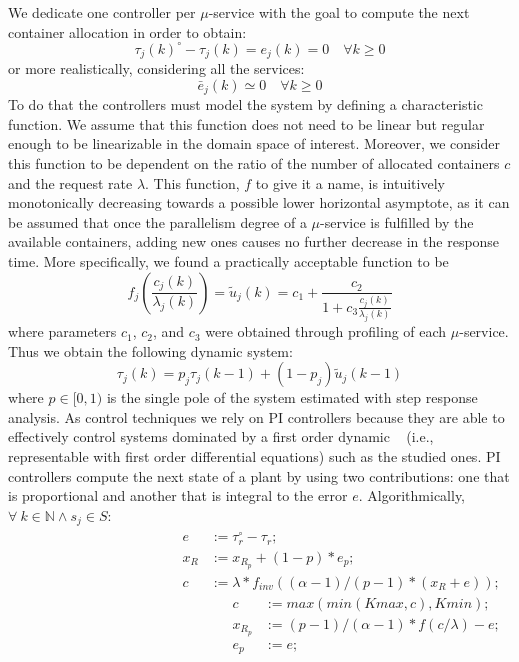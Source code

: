 We dedicate one controller per $\mu$-service with the goal to compute the next container allocation in order to obtain:
{\scriptsize
\begin{equation}
\tau_j(k)^\circ - \tau_j(k) = e_j(k) = 0\quad \forall{k} \ge 0
\end{equation}
}%
or more realistically, considering all the services:
{\scriptsize
\begin{equation}
\bar{e}_j(k) \simeq 0 \quad \forall{k} \ge 0
\end{equation}
}%
To do that the controllers must model the system 
by defining a characteristic function. We assume that this function does not need to be linear but regular enough to be linearizable in the domain space of interest. Moreover, we consider this function to be dependent on the ratio of the number of allocated containers $c$ and the request rate $\lambda$. This function, $f$ to give it a name, is intuitively monotonically decreasing towards a possible lower horizontal asymptote, as it can be assumed that once the parallelism degree of a $\mu$-service is fulfilled by the available containers, adding new ones causes no further decrease in the response time. More specifically, we found a practically acceptable function to be
{\scriptsize
\begin{equation}
f_j \left( \frac{c_j(k)}{\lambda_j(k)}\right)  = \widetilde{u}_j(k) = c_1+\frac{c_2}{1+c_3\frac{c_j(k)}{\lambda_j(k)}}
\label{eqn:CsysModel-f}
\end{equation}
}%
\noindent where parameters $c_1$, $c_2$, and $c_3$ were obtained through profiling of each $\mu$-service. Thus we obtain the following dynamic system:
{\scriptsize
\begin{equation}
\tau_j(k)  = p_j \tau_j(k-1) + (1-p_j)\widetilde{u}_j(k-1)
\label{eqn:CsysModel-s}
\end{equation}
}%
where $p \in [0,1)$ is the single pole of the system estimated with step response analysis. As control techniques we rely on PI controllers because they are able to effectively control systems dominated by a first order dynamic ~\cite{aastrom1995pid} (i.e., representable with first order differential equations) such as the studied ones. PI controllers compute the next state of a plant by using two contributions: one that is proportional and another that is integral to the error $e$. Algorithmically, $\forall\ k \in \mathbb{N} \wedge  s_j \in S$: 
{\scriptsize
\begin{align*}
\begin{split}
e   &:= \tau_r^{\circ}-\tau_r;\\
x_R &:= x_{R_p}+(1-p)*e_p;\\
c   &:= \lambda*f_{inv}((\alpha-1)/(p-1)*(x_R+e));
\end{split}
\begin{split}
c   &:= max(min(Kmax,c), Kmin);\\
x_{R_p} &:= (p-1)/(\alpha-1)*f(c/\lambda)-e;\\
e_p  &:= e;
\end{split}
\end{align*}
}%
